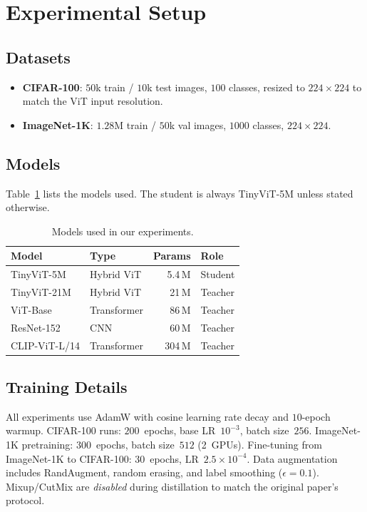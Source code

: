 \documentclass[10pt,twocolumn]{article}
\begin{document}
\section{Experimental Setup}
\label{sec:setup}

\subsection{Datasets}

\begin{itemize}
  \item \textbf{CIFAR-100}: $50$k train / $10$k test images, $100$ classes,
        resized to $224\times224$ to match the ViT input resolution.
  \item \textbf{ImageNet-1K}: $1.28$M train / $50$k val images, $1000$
        classes, $224\times224$.
\end{itemize}

\subsection{Models}

Table~\ref{tab:models} lists the models used.
The student is always TinyViT-5M unless stated otherwise.

\begin{table}[h]
\centering
\caption{Models used in our experiments.}
\label{tab:models}
\small
\begin{tabular}{@{}llrl@{}}
\toprule
Model & Type & Params & Role \\
\midrule
TinyViT-5M  & Hybrid ViT & 5.4\,M  & Student \\
TinyViT-21M & Hybrid ViT & 21\,M   & Teacher \\
ViT-Base    & Transformer & 86\,M  & Teacher \\
ResNet-152  & CNN         & 60\,M  & Teacher \\
CLIP-ViT-L/14 & Transformer & 304\,M & Teacher \\
\bottomrule
\end{tabular}
\end{table}

\subsection{Training Details}

All experiments use AdamW with cosine learning rate decay and $10$-epoch
warmup.
CIFAR-100 runs: $200$~epochs, base LR~$10^{-3}$, batch size~$256$.
ImageNet-1K pretraining: $300$~epochs, batch size~$512$ (2~GPUs).
Fine-tuning from ImageNet-1K to CIFAR-100: $30$~epochs, LR~$2.5\times10^{-4}$.
Data augmentation includes RandAugment, random erasing, and label smoothing
($\epsilon=0.1$). Mixup/CutMix are \emph{disabled} during distillation
to match the original paper's protocol.
\end{document}

